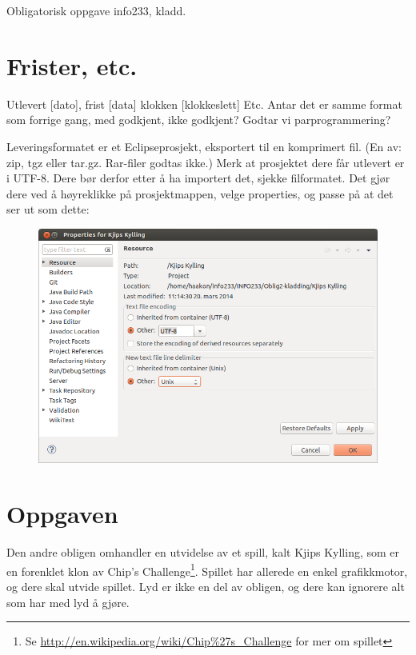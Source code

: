 \documentclass[norsk]{article}
\begin{document}
Obligatorisk oppgave info233, kladd.

\section{Frister, etc.}
\label{sec:frister-og-regler}
Utlevert [dato], frist [data] klokken [klokkeslett]
Etc. Antar det er samme format som forrige gang, med godkjent, ikke godkjent?
Godtar vi parprogrammering?

Leveringsformatet er et Eclipseprosjekt, eksportert til en komprimert fil. (En av: zip, tgz eller tar.gz. Rar-filer godtas ikke.) %
Merk at prosjektet dere får utlevert er i UTF-8. Dere bør derfor etter å ha importert det, sjekke filformatet. Det gjør dere ved å høyreklikke på prosjektmappen, velge properties, og passe på at det ser ut som dette:
\begin{figure}[h!]
  \centering
    \includegraphics[width=1\textwidth]{slik-ser-det-ut.png}
\end{figure}



\section{Oppgaven}
\label{sec:oppgaven}
Den andre obligen omhandler en utvidelse av et spill, kalt Kjips Kylling, som er en forenklet klon av Chip's Challenge\footnote{Se \url{http://en.wikipedia.org/wiki/Chip\%27s_Challenge} for mer om spillet}.
Spillet har allerede en enkel grafikkmotor, og dere skal utvide spillet.
Lyd er ikke en del av obligen, og dere kan ignorere alt som har med lyd å gjøre. %
\end{document}
